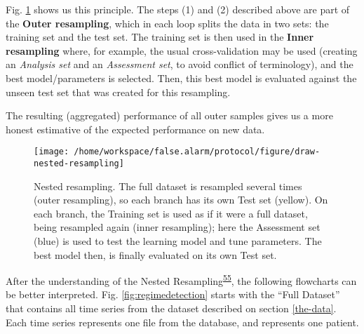 \documentclass[12pt,twoside]{fmupthesis}
\begin{document}
Fig. \ref{fig:nestedresampling} shows us this principle. The steps (1) and (2) described above are
part of the \textbf{Outer resampling}, which in each loop splits the data in two sets: the training set
and the test set. The training set is then used in the \textbf{Inner resampling} where, for example, the
usual cross-validation may be used (creating an \emph{Analysis set} and an \emph{Assessment set}, to avoid
conflict of terminology), and the best model/parameters is selected. Then, this best model is
evaluated against the unseen test set that was created for this resampling.

The resulting (aggregated) performance of all outer samples gives us a more honest estimative
of the expected performance on new data.
\begin{figure}

{\centering \texttt{[image: /home/workspace/false.alarm/protocol/figure/draw-nested-resampling]} 

}

\caption{Nested resampling. The full dataset is resampled several times (outer resampling), so each branch has its own Test set (yellow). On each branch, the Training set is used as if it were a full dataset, being resampled again (inner resampling); here the Assessment set (blue) is used to test the learning model and tune parameters. The best model then, is finally evaluated on its own Test set.}\label{fig:nestedresampling}
\end{figure}
\hfill\break

After the understanding of the Nested Resampling\textsuperscript{\protect\hyperlink{ref-Bischl2012}{55}}, the following flowcharts can be
better interpreted. Fig. \ref{fig:regimedetection} starts with the ``Full Dataset'' that contains all
time series from the dataset described on section \ref{the-data}. Each time series represents one
file from the database, and represents one patient.
\end{document}

